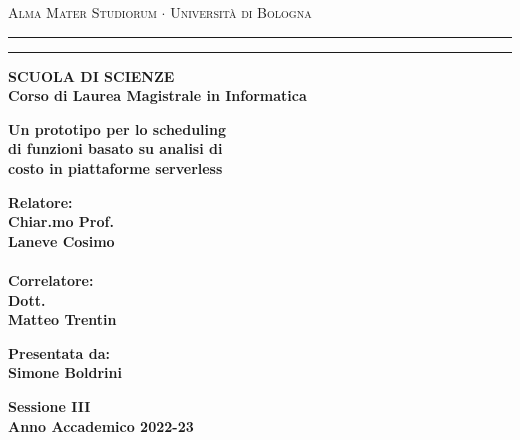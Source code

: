 \documentclass[../main.tex]{subfiles}
\begin{document}
\begin{titlepage}
\begin{center}
{{\Large{\textsc{Alma Mater Studiorum $\cdot$ Universit\`a di
Bologna}}}} \rule[0.1cm]{15.8cm}{0.1mm}
\rule[0.5cm]{15.8cm}{0.6mm}
{\small{\bf SCUOLA DI SCIENZE\\
Corso di Laurea Magistrale in Informatica}}
\end{center}
\vspace{15mm}
\begin{center}
{\LARGE{\bf Un prototipo per lo scheduling}}\\
\vspace{3mm}
{\LARGE{\bf di funzioni basato su analisi di }}\\
\vspace{3mm}
{\LARGE{\bf costo in piattaforme serverless}}\\
\end{center}
\vspace{40mm}
\par
\noindent
\begin{minipage}[t]{0.47\textwidth}
{\large{\bf Relatore:\\
Chiar.mo Prof.\\
Laneve Cosimo\\}}
{\large{\bf \\Correlatore:\\
Dott.\\ Matteo Trentin}
}
\end{minipage}
\hfill
\begin{minipage}[t]{0.47\textwidth}\raggedleft
{\large{\bf Presentata da:\\
Simone Boldrini}}
\end{minipage}
\vspace{20mm}
\begin{center}
{\large{\bf Sessione III\\%
Anno Accademico 2022-23}}%
\end{center}
\end{titlepage}
\end{document}
